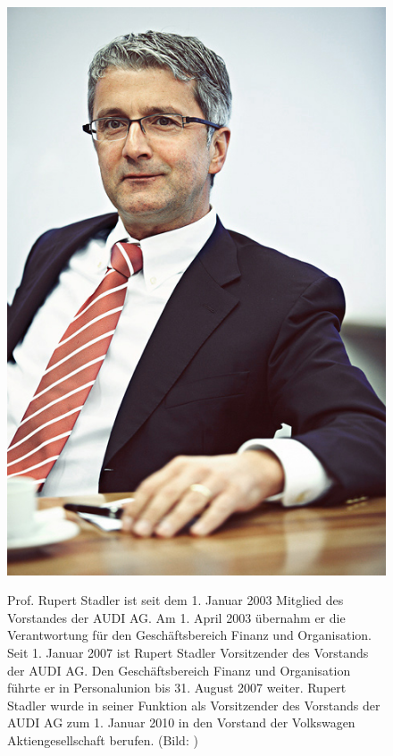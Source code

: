 \documentclass[12pt]{article}
\begin{document}
\begin{figure}[here!]
	\centering
	\begin{minipage}[h]{0.20\textwidth}
		\centering
		\includegraphics[width=1.0\textwidth]{images/RupertStadler.jpg}
		\label{fig:vorstandvw8}
	\end{minipage}
	\begin{minipage}[h]{0.10\textwidth}
		\hspace{1cm} 
	\end{minipage}
	\begin{minipage}[h]{0.65\textwidth}
		Prof. Rupert Stadler ist seit dem 1. Januar 2003 Mitglied des Vorstandes der AUDI AG. Am 1. April 2003 übernahm er die Verantwortung für den Geschäftsbereich Finanz und Organisation. Seit 1. Januar 2007 ist Rupert Stadler Vorsitzender des Vorstands der AUDI AG. Den Geschäftsbereich Finanz und Organisation führte er in Personalunion bis 31. August 2007 weiter. Rupert Stadler wurde in seiner Funktion als Vorsitzender des Vorstands der AUDI AG zum 1. Januar 2010 in den Vorstand der Volkswagen Aktiengesellschaft berufen. (Bild: \cite{rspic} )
	\end{minipage}
\end{figure}
\cite{vorstand}
\end{document}

